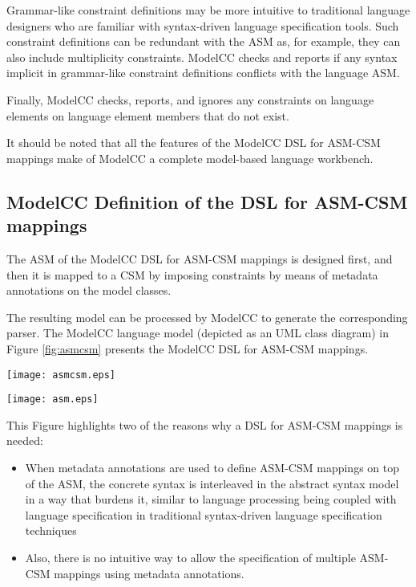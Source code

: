 \documentclass[floatfix,rmp,twocolumn,twoside]{revtex4}
\begin{document}
Grammar-like constraint definitions may be more intuitive to traditional language designers who are familiar with syntax-driven language specification tools.
Such constraint definitions can be redundant with the ASM as, for example, they can also include multiplicity constraints.
ModelCC checks and reports if any syntax implicit in grammar-like constraint definitions conflicts with the language ASM.

Finally, ModelCC checks, reports, and ignores any constraints on language elements on language element members that do not exist.

It should be noted that all the features of the ModelCC DSL for ASM-CSM mappings make of ModelCC a complete model-based language workbench.

\subsection{ModelCC Definition of the DSL for ASM-CSM mappings} \label{sec:modimp}

\noindent The ASM of the ModelCC DSL for ASM-CSM mappings is designed first, and then it is mapped to a CSM by imposing constraints by means of metadata annotations on the model classes.

The resulting model can be processed by ModelCC to generate the corresponding parser.
The ModelCC language model (depicted as an UML class diagram) in Figure \ref{fig:asmcsm} presents the ModelCC DSL for ASM-CSM mappings.

\begin{figure*}[tb]
\centering
\texttt{[image: asmcsm.eps]}
\caption{Definition of the ModelCC DSL for ASM-CSM mappings in ModelCC.} \label{fig:asmcsm}
\end{figure*}

\begin{figure*}[tb]
\centering
\texttt{[image: asm.eps]}
\caption{Definition of the abstract syntax model of the ModelCC DSL for ASM-CSM mappings in ModelCC.} \label{fig:asm}
\end{figure*}

This Figure highlights two of the reasons why a DSL for ASM-CSM mappings is needed:
\begin{itemize}
\item When metadata annotations are used to define ASM-CSM mappings on top of the ASM, the concrete syntax is interleaved in the abstract syntax model in a way that burdens it, similar to language processing being coupled with language specification in traditional syntax-driven language specification techniques
\item Also, there is no intuitive way to allow the specification of multiple ASM-CSM mappings using metadata annotations.
\end{itemize}
\end{document}
